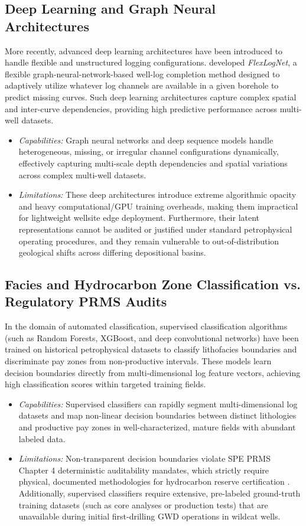 \subsection{Deep Learning and Graph Neural Architectures}
More recently, advanced deep learning architectures have been introduced to handle flexible and unstructured logging configurations. \citet{ref6} developed \textit{FlexLogNet}, a flexible graph-neural-network-based well-log completion method designed to adaptively utilize whatever log channels are available in a given borehole to predict missing curves. Such deep learning architectures capture complex spatial and inter-curve dependencies, providing high predictive performance across multi-well datasets.
\begin{itemize}
    \item \textit{Capabilities:} Graph neural networks and deep sequence models handle heterogeneous, missing, or irregular channel configurations dynamically, effectively capturing multi-scale depth dependencies and spatial variations across complex multi-well datasets.
    \item \textit{Limitations:} These deep architectures introduce extreme algorithmic opacity and heavy computational/GPU training overheads, making them impractical for lightweight wellsite edge deployment. Furthermore, their latent representations cannot be audited or justified under standard petrophysical operating procedures, and they remain vulnerable to out-of-distribution geological shifts across differing depositional basins.
\end{itemize}

\subsection{Facies and Hydrocarbon Zone Classification vs. Regulatory PRMS Audits}
In the domain of automated classification, supervised classification algorithms (such as Random Forests, XGBoost, and deep convolutional networks) have been trained on historical petrophysical datasets to classify lithofacies boundaries and discriminate pay zones from non-productive intervals. These models learn decision boundaries directly from multi-dimensional log feature vectors, achieving high classification scores within targeted training fields.
\begin{itemize}
    \item \textit{Capabilities:} Supervised classifiers can rapidly segment multi-dimensional log datasets and map non-linear decision boundaries between distinct lithologies and productive pay zones in well-characterized, mature fields with abundant labeled data.
    \item \textit{Limitations:} Non-transparent decision boundaries violate SPE PRMS Chapter 4 deterministic auditability mandates, which strictly require physical, documented methodologies for hydrocarbon reserve certification \citep{ref2, ref3}. Additionally, supervised classifiers require extensive, pre-labeled ground-truth training datasets (such as core analyses or production tests) that are unavailable during initial first-drilling GWD operations in wildcat wells.
\end{itemize}